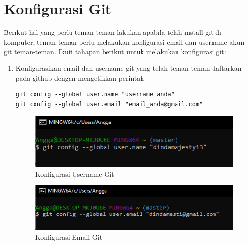 \section{Konfigurasi Git}
Berikut hal yang perlu teman-teman lakukan apabila telah install git di komputer, teman-teman perlu melakukan konfigurasi email dan username akun git teman-teman. Ikuti tahapan berikut untuk melakukan konfigurasi git:
\begin{enumerate}
\item Konfigurasikan email dan username git yang telah teman-teman daftarkan pada github dengan mengetikkan perintah
\begin{verbatim}
git config --global user.name "username anda"
git config --global user.email "email_anda@gmail.com"
\end{verbatim}
\begin{figure}[H]
\centering
\includegraphics[scale=.75]{figures/konfig_git1}
\caption{Konfigurasi Username Git}
\label{konfig_git1}
\end{figure}

\begin{figure}[H]
\centering
\includegraphics[scale=.75]{figures/konfig_git2}
\caption{Konfigurasi Email Git}
\label{konfig_git2}
\end{figure}


\end{enumerate}
